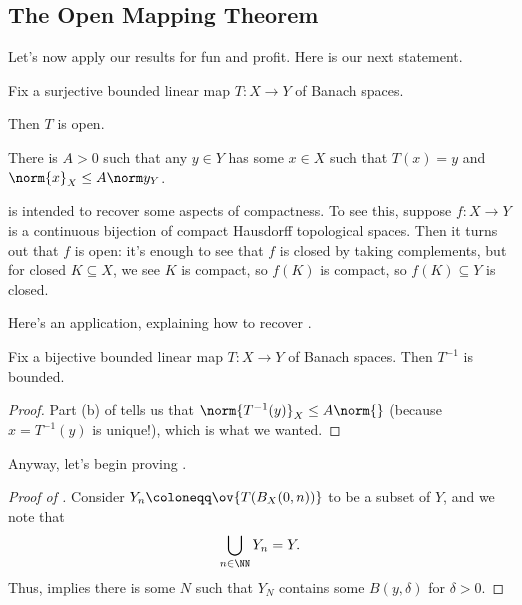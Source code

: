 \documentclass[../notes.tex]{subfiles}
\begin{document}
\subsection{The Open Mapping Theorem}
Let's now apply our results for fun and profit. Here is our next statement.
\begin{theorem} \label{thm:open-map}
	Fix a surjective bounded linear map $T\colon X\to Y$ of Banach spaces.
	\begin{listalph}
		\item Then $T$ is open.
		\item There is $A>0$ such that any $y\in Y$ has some $x\in X$ such that $T(x)=y$ and $\norm{x}_X\le A\norm y_Y$.
	\end{listalph}
\end{theorem}
\begin{remark} \label{rem:continuous-bijection}
	 is intended to recover some aspects of compactness. To see this, suppose $f\colon X\to Y$ is a continuous bijection of compact Hausdorff topological spaces. Then it turns out that $f$ is open: it's enough to see that $f$ is closed by taking complements, but for closed $K\subseteq X$, we see $K$ is compact, so $f(K)$ is compact, so $f(K)\subseteq Y$ is closed.
\end{remark}
Here's an application, explaining how to recover .
\begin{corollary}
	Fix a bijective bounded linear map $T\colon X\to Y$ of Banach spaces. Then $T^{-1}$ is bounded.
\end{corollary}
\begin{proof}
	Part (b) of  tells us that $\norm{T^{-1}(y)}_X\le A\norm{}$ (because $x=T^{-1}(y)$ is unique!), which is what we wanted.
\end{proof}
Anyway, let's begin proving .
\begin{proof}[Proof of ]
	Consider $Y_n\coloneqq\ov{T(B_X(0,n))}$ to be a subset of $Y$, and we note that
	\[\bigcup_{n\in\NN}Y_n=Y.\]
	Thus,  implies there is some $N$ such that $Y_N$ contains some $B(y,\delta)$ for $\delta>0$.
\end{proof}
\end{document}
